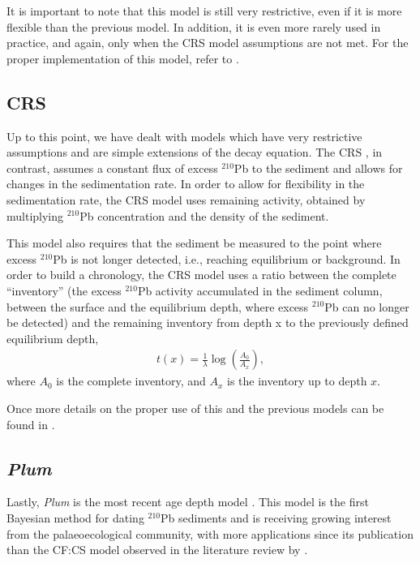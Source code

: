 \documentclass [10pt] {article}
\begin{document}
It is important to note that this model is still very restrictive, even if it is more flexible than the previous model. 
In addition, it is even more rarely used in practice, and again, only when the CRS model assumptions are not met.
For the proper implementation of this model, refer to \citet{Sanchez-Cabeza2012}.


\subsection{CRS}

Up to this point, we have dealt with models which have very restrictive assumptions and are simple extensions of the decay equation. 
The CRS \citep{Appleby1978,Appleby1998,Appleby2001,Appleby2008}, in contrast, assumes a constant flux of excess $^{210}$Pb to the sediment and allows for changes in the sedimentation rate. 
In order to allow for flexibility in the sedimentation rate, the CRS model uses remaining activity, obtained by multiplying $^{210}$Pb concentration and the density of the sediment. 

This model also requires that the sediment be measured to the point where excess $^{210}$Pb is not longer detected, i.e., reaching equilibrium or background.
In order to build a chronology, the CRS model uses a ratio between the complete “inventory” (the excess $^{210}$Pb activity accumulated in the sediment column, between the surface and the equilibrium depth, where excess $^{210}$Pb can no longer be detected) and the remaining inventory from depth x to the previously defined equilibrium depth,
\begin{eqnarray}
	t(x)=\frac{1}{\lambda}\log\left( \frac{A_0}{A_x}\right),
\end{eqnarray}
where $A_0$ is the complete inventory, and $A_x$ is the inventory up to depth $x$.


Once more details on the proper use of this and the previous models can be found in \citet{Sanchez-Cabeza2012}.

\subsection{\textit{Plum}}

Lastly, \textit{Plum} is the most recent age depth model \citep{Aquino2018}.
This model is the first Bayesian method for dating $^{210}$Pb sediments and is receiving growing interest from the palaeoecological community, with more applications since its publication than the CF:CS model observed in the literature review by \citet{Courtney2019}.
\end{document}
